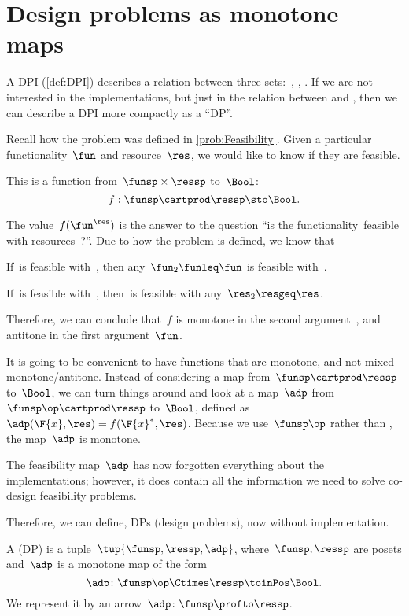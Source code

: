

\section{Design problems as monotone maps}
\label{sec:dpdefinition}

A DPI (\cref{def:DPI}) describes a relation between three sets:~\funsp, \ressp, \impsp.
If we are not interested in the implementations, but just in the relation between \funsp and \ressp, then we can describe a DPI more compactly as a ``DP''\@.

Recall how the problem \Feasibility was defined in \cref{prob:Feasibility}.
Given a particular functionality~$\fun$ and resource~$\res$, we would like to know if they are feasible.

This is a function from~$\funsp \times \ressp$ to~$\Bool$:
\begin{equation}
  f: \funsp \cartprod \ressp \sto \Bool.
\end{equation}

The value~$f(\fun^\res)$ is the answer to the question ``is the functionality~\fun feasible with resources~\res?''. Due to how the problem is defined, we know that%
\begin{compactenum}
  \item If~\fun is feasible with~\res, then any~$\fun_2 \funleq \fun$ is feasible with~\res.
  \item If~\fun is feasible with~\res, then~\fun is feasible with any~$\res_2 \resgeq \res$.
\end{compactenum}
Therefore, we can conclude that~$f$ is monotone in the second argument~\res, and antitone in the first argument~$\fun$.

It is going to be convenient to have functions that are monotone, and not mixed
monotone/antitone.
Instead of considering a map from~$\funsp \cartprod \ressp$ to~$\Bool$, we can turn things around and look at a map~$\adp$ from~$\funsp\op \cartprod \ressp$ to~$\Bool$, defined as~$\adp(\F{x},\res) = f(\F{x}^*,\res)$.
Because we use~$\funsp\op$ rather than \funsp, the map~$\adp$ is monotone.

The feasibility map~$\adp$ has now forgotten everything about the implementations; however, it does contain all the information we need to solve co-design feasibility problems.

Therefore, we can define, DPs (design problems), now without implementation.


\begin{definition}
  \label{def:design-problem}
  A  (DP) is a tuple~$\tup{\funsp, \ressp, \adp}$, where~$\funsp, \ressp$ are posets and~$\adp$ is a monotone map of the form%
  \begin{equation*}
    \label{eq:design_prob_as_monfun}
    \adp \colon  \funsp\op \Ctimes \ressp \toinPos \Bool.
  \end{equation*}
  We represent it by an arrow~$\adp \colon \funsp \profto \ressp$.
\end{definition}

